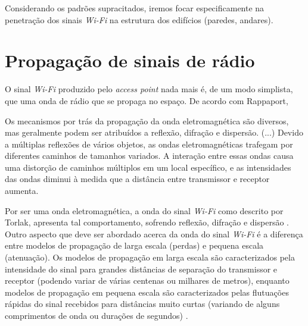 \documentclass[
	12pt,				%
	twoside,			%
	a4paper,			%
	english,			%
	french,				%
	spanish,			%
	brazil				%
	]{abntex2}
\begin{document}
Considerando os padrões supracitados, iremos focar especificamente na
penetração dos sinais \emph{Wi-Fi} na estrutura dos edifícios (paredes,
andares).

\section{Propagação de sinais de
rádio}\label{propagauxe7uxe3o-de-sinais-de-ruxe1dio}

O sinal \emph{Wi-Fi} produzido pelo \emph{access point} nada mais é, de
um modo simplista, que uma onda de rádio que se propaga no espaço. De
acordo com Rappaport,

\begin{citacao}
    Os mecanismos por trás da propagação da onda eletromagnética são diversos, mas geralmente podem ser atribuídos a reflexão, difração e dispersão. (...) Devido a múltiplas reflexões de vários objetos, as ondas eletromagnéticas trafegam por diferentes caminhos de tamanhos variados. A interação entre essas ondas causa uma distorção de caminhos múltiplos em um local específico, e as intensidades das ondas diminui à medida que a distância entre transmissor e receptor aumenta. \cite[p. 72]{RAPPAPORT}
    
\end{citacao}

Por ser uma onda eletromagnética, a onda do sinal \emph{Wi-Fi} como
descrito por Torlak, apresenta tal comportamento, sofrendo reflexão,
difração e dispersão \cite{TORLAK}. Outro aspecto que deve ser abordado
acerca da onda do sinal \emph{Wi-Fi} é a diferença entre modelos de
propagação de larga escala (perdas) e pequena escala (atenuação). Os
modelos de propagação em larga escala são caracterizados pela
intensidade do sinal para grandes distâncias de separação do transmissor
e receptor (podendo variar de várias centenas ou milhares de metros),
enquanto modelos de propagação em pequena escala são caracterizados
pelas flutuações rápidas do sinal recebidos para distâncias muito curtas
(variando de alguns comprimentos de onda ou durações de segundos)
\cite[p. 72]{RAPPAPORT}.
\end{document}
